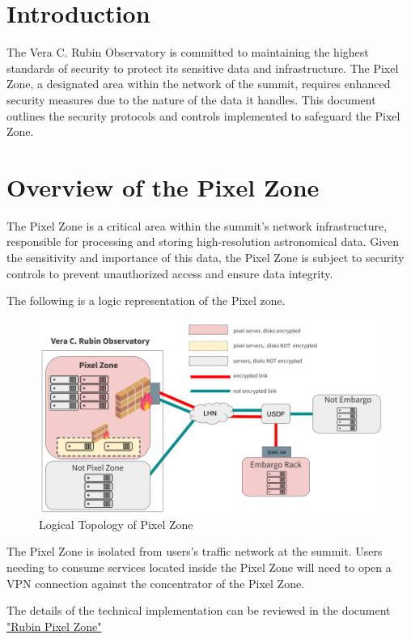 \section{Introduction}

The Vera C. Rubin Observatory is committed to maintaining the highest standards of security to protect its sensitive data and infrastructure. The Pixel Zone, a designated area within the network of the summit, requires enhanced security measures due to the nature of the data it handles. This document outlines the security protocols and controls implemented to safeguard the Pixel Zone.

\section{Overview of the Pixel Zone}
The Pixel Zone is a critical area within the summit's network infrastructure, responsible for processing and storing high-resolution astronomical data. Given the sensitivity and importance of this data, the Pixel Zone is subject to security controls to prevent unauthorized access and ensure data integrity.

The following is a logic representation of the Pixel zone. 

\begin{figure}
    \includegraphics[width=13cm]{emgargo_diagram.png}
    \centering
    \caption*{Logical Topology of Pixel Zone}
  \end{figure}

The Pixel Zone is isolated from users's traffic network at the summit. Users needing to consume services located inside the Pixel Zone will need to open a VPN connection against the concentrator of the Pixel Zone. 

The details of the technical implementation can be reviewed in the document \href{http://ittn-075.lsst.io}{"Rubin Pixel Zone"}



